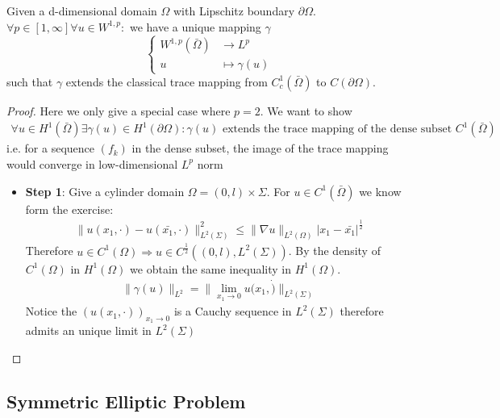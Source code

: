 \begin{theorem}
	Given a d-dimensional domain $\Omega$ with Lipschitz boundary $\partial \Omega$. $\forall p \in [1, \infty] \forall u \in W^{1, p}:$ we have a unique mapping $\gamma$
	\begin{equation*}
	\left\{
	\begin{aligned}
		W^{1, p}(\bar{\Omega}) &\rightarrow L^p\\
		u &\mapsto \gamma(u) 
	\end{aligned}
	\right.	
	\end{equation*}
	such that $\gamma$ extends the classical trace mapping from $C^1_c(\bar{\Omega})$ to $C(\partial\Omega)$.
\end{theorem}
\begin{proof}
	Here we only give a special case where $p = 2$. We want to show
	\begin{align*}
		\forall u \in H^1(\bar{\Omega})\exists \gamma(u) \in H^1(\partial \Omega): \text{$\gamma(u)$ extends the trace mapping of the dense subset $C^1(\bar{\Omega})$}
	\end{align*}
	i.e. for a sequence $(f_k)$ in the dense subset, the image of the trace mapping would converge in low-dimensional $L^p$ norm
\begin{itemize}
\item \textbf{Step 1}: Give a cylinder domain $\Omega = (0, l) \times \Sigma$. For $u \in C^1(\bar{\Omega})$ we know form the exercise:
	\begin{align*}
		\|u(x_1, \cdot) - u(\bar{x_1}, \cdot)\|_{L^2(\Sigma)}^2 \leq 
		\|\nabla u\|_{L^2(\Omega)} |x_1 - \bar{x_1}|^{\frac{1}{2}}
	\end{align*}
    Therefore $u \in C^1(\Omega) \Rightarrow u \in C^{\frac{1}{2}}((0, l), L^2(\Sigma))$. By the density of $C^1(\Omega)$ in $H^1(\Omega)$ we obtain the same inequality in $H^1(\Omega)$.
    \begin{align*}
    	\|\gamma(u)\|_{L^2} = \|\lim_{x_1 \rightarrow 0} u(x_1, \dot)\|_{L^2(\Sigma)}
    \end{align*}
    Notice the $(u(x_1, \cdot))_{x_1 \rightarrow 0}$ is a Cauchy sequence in $L^2(\Sigma)$ therefore admits an unique limit in $L^2(\Sigma)$
\end{itemize}
\end{proof}


\subsection{Symmetric Elliptic Problem}
